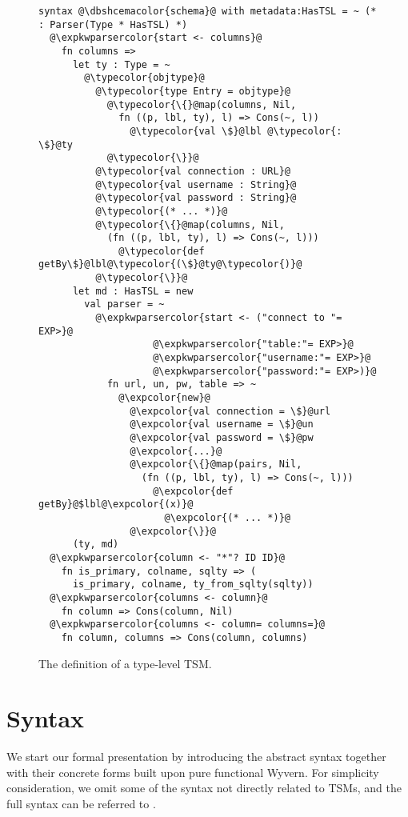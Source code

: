 \documentclass{sig-alternate}
\newcommand{\expkwparsercolor}[1]{\textcolor[HTML]{336699}{#1}}
\newcommand{\expcolor}[1]{\textcolor[HTML]{FF0033}{#1}}
\newcommand{\typecolor}[1]{\textcolor[HTML]{660066}{#1}}
\newcommand{\dbshcemacolor}[1]{\textcolor[HTML]{5AC3D1}{#1}}
\newcommand{\mycaption}[1]{\vspace{-4px}\caption{#1}\vspace{-2px}}
\begin{document}
\begin{figure}[t]
\begin{lstlisting}[style=wyvern]
syntax @\dbshcemacolor{schema}@ with metadata:HasTSL = ~ (* : Parser(Type * HasTSL) *)
  @\expkwparsercolor{start <- columns}@
    fn columns =>
      let ty : Type = ~
        @\typecolor{objtype}@
          @\typecolor{type Entry = objtype}@
            @\typecolor{\{}@map(columns, Nil, 
              fn ((p, lbl, ty), l) => Cons(~, l))
                @\typecolor{val \$}@lbl @\typecolor{:  \$}@ty
            @\typecolor{\}}@
          @\typecolor{val connection : URL}@
          @\typecolor{val username : String}@
          @\typecolor{val password : String}@
          @\typecolor{(* ... *)}@
          @\typecolor{\{}@map(columns, Nil, 
            (fn ((p, lbl, ty), l) => Cons(~, l)))
              @\typecolor{def getBy\$}@lbl@\typecolor{(\$}@ty@\typecolor{)}@
          @\typecolor{\}}@
      let md : HasTSL = new 
        val parser = ~
          @\expkwparsercolor{start <- ("connect to "= EXP>}@
                    @\expkwparsercolor{"table:"= EXP>}@
                    @\expkwparsercolor{"username:"= EXP>}@
                    @\expkwparsercolor{"password:"= EXP>)}@
            fn url, un, pw, table => ~
              @\expcolor{new}@ 
                @\expcolor{val connection = \$}@url
                @\expcolor{val username = \$}@un
                @\expcolor{val password = \$}@pw
                @\expcolor{...}@
                @\expcolor{\{}@map(pairs, Nil, 
                  (fn ((p, lbl, ty), l) => Cons(~, l)))
                    @\expcolor{def getBy}@$lbl@\expcolor{(x)}@ 
                      @\expcolor{(* ... *)}@
                @\expcolor{\}}@
      (ty, md)
  @\expkwparsercolor{column <- "*"? ID ID}@
    fn is_primary, colname, sqlty => (
      is_primary, colname, ty_from_sqlty(sqlty))
  @\expkwparsercolor{columns <- column}@
    fn column => Cons(column, Nil)
  @\expkwparsercolor{columns <- column= columns=}@
    fn column, columns => Cons(column, columns)
\end{lstlisting}
\mycaption{The definition of a type-level TSM.}
\label{typekw-example-1}
\end{figure}

\section{Syntax}\label{theory}
We start our formal presentation by introducing the abstract syntax together with their concrete forms built upon pure functional Wyvern. For simplicity consideration, we omit some of the syntax not directly related to TSMs, and the full syntax can be referred to .
\end{document}
